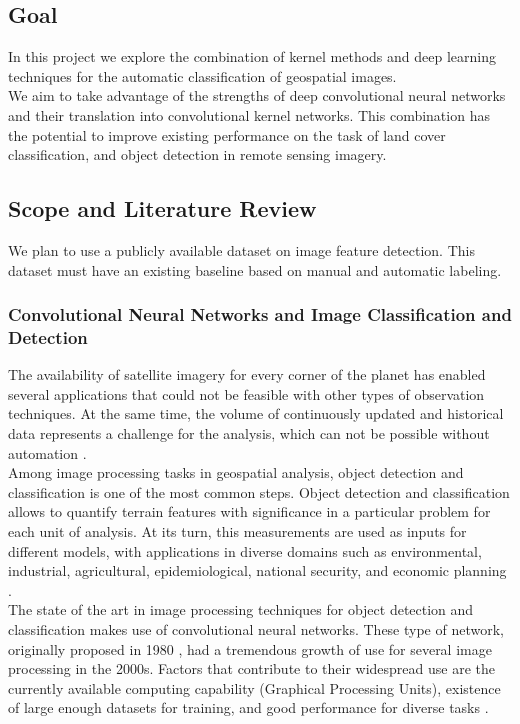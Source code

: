 \documentclass{article}
\begin{document}
\subsection{Goal}

In this project we explore the combination of kernel methods and deep learning techniques for the automatic classification of geospatial images.\\

We aim to take advantage of the strengths of deep convolutional neural networks and their translation into convolutional kernel networks. This combination has the potential to improve existing performance on the task of land cover classification, and object detection in remote sensing imagery.

\subsection{Scope and Literature Review}
We plan to use a publicly available dataset on image feature detection. This dataset must have an existing baseline based on manual and automatic labeling.\\

\subsubsection{Convolutional Neural Networks and Image Classification and Detection}

The availability of satellite imagery for every corner of the planet has enabled several applications that could not be feasible with other types of observation techniques. At the same time, the volume of continuously updated and historical data represents a challenge for the analysis, which can not be possible without automation \cite{maggiori2016convolutional}.\\

Among  image processing tasks in geospatial analysis, object detection and classification is one of the most common steps. Object detection and classification allows to quantify terrain features with significance in a particular problem for each unit of analysis. At its turn, this measurements are used as inputs for different models, with applications in diverse domains such as environmental, industrial, agricultural, epidemiological, national security, and economic planning \cite{maggiori2016convolutional}.\\

The state of the art in image processing techniques for object detection and classification makes use of convolutional neural networks. These type of network, originally proposed in 1980 \cite{fukushima1980neocognitron}, had a tremendous growth of use for several image processing in the 2000s. Factors that contribute to their widespread use are the currently available computing capability (Graphical Processing Units), existence of large enough datasets for training, and good performance for diverse tasks \cite{liu2017survey}.\\
\end{document}
